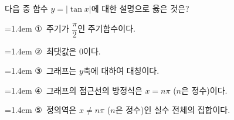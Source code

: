 다음 중 함수 $y=|\tan x|$에 대한 설명으로 옳은 것은?
\par\medskip\par\noindent\hangindent=1.4em {\small ①}\ 주기가 $\dfrac{\pi}{2}$인 주기함수이다.\par\noindent\hangindent=1.4em {\small ②}\ 최댓값은 $0$이다.\par\noindent\hangindent=1.4em {\small ③}\ 그래프는 $y$축에 대하여 대칭이다.\par\noindent\hangindent=1.4em {\small ④}\ 그래프의 점근선의 방정식은 $x=n\pi$ ($n$은 정수)이다.\par\noindent\hangindent=1.4em {\small ⑤}\ 정의역은 $x\ne n\pi$ ($n$은 정수)인 실수 전체의 집합이다.\par\medskip
